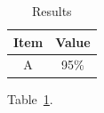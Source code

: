 \documentclass{article}
\begin{document}
\begin{table}[htbp]
  \centering
  \begin{tabular*}{0.8\textwidth}{@{\extracolsep{\fill}}cc}
    \toprule
    Item & Value \\
    \midrule
    A & 95\% \\
    \bottomrule
  \end{tabular*}
  \caption{Results}
  \label{tab:results}
\end{table}
Table~\ref{tab:results}.
\end{document}
